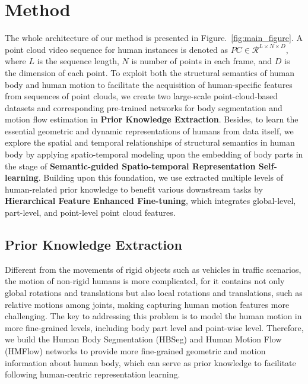 \label{sec:method}

\section{Method}
The whole architecture of our method is presented in Figure.~\ref{fig:main_figure}. A point cloud video sequence for human instances is denoted as $PC \in 
 \mathcal{R}^{L \times N \times D}$, where $L$ is the sequence length, $N$ is number of points in each frame, and $D$ is the dimension of each point. 
To exploit both the structural semantics of human body and human motion to facilitate the acquisition of human-specific features from sequences of point clouds, we create two large-scale point-cloud-based datasets and corresponding pre-trained networks for body segmentation and motion flow estimation in \textbf{Prior Knowledge Extraction}.
Besides, to learn the essential geometric and dynamic representations of humans from data itself, we explore the spatial and temporal relationships of structural semantics in human body by applying spatio-temporal modeling upon the embedding of body parts in the stage of \textbf{Semantic-guided Spatio-temporal Representation Self-learning}.
Building upon this foundation, we use extracted multiple levels of human-related prior knowledge to benefit various downstream tasks by \textbf{Hierarchical Feature Enhanced Fine-tuning}, which integrates global-level, part-level, and point-level point cloud features.



\subsection{Prior Knowledge Extraction}
Different from the movements of rigid objects such as vehicles in traffic scenarios, the motion of non-rigid humans is more complicated, for it contains not only global rotations and translations but also local rotations and translations, such as relative motions among joints, making capturing human motion features more challenging. The key to addressing this problem is to model the human motion in more fine-grained levels, including body part level and point-wise level. Therefore, we build the Human Body Segmentation (HBSeg) and Human Motion Flow (HMFlow) networks to provide more fine-grained geometric and motion information about human body, which can serve as prior knowledge to facilitate following human-centric representation learning.
